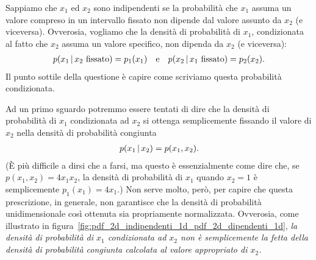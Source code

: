 Sappiamo che $x_1$ ed $x_2$ sono indipendenti se la probabilità che $x_1$
assuma un valore compreso in un intervallo fissato non dipende dal valore assunto
da $x_2$ (e viceversa). Ovverosia, vogliamo che la densità di probabilità di
$x_1$, condizionata al fatto che $x_2$ assuma un valore specifico, non dipenda
da $x_2$ (e viceversa):
\begin{align*}
  p(x_1 \,|\, x_2~\text{fissato}) = p_1(x_1) \quad \text{e} \quad
  p(x_2 \,|\, x_1~\text{fissato}) = p_2(x_2).
\end{align*}
Il punto sottile della questione è capire come scriviamo questa probabilità
condizionata.

Ad un primo sguardo potremmo essere tentati di dire che la densità di probabilità
di $x_1$ condizionata ad $x_2$ si ottenga semplicemente fissando il valore
di $x_2$ nella densità di probabilità congiunta
\begin{align*}
  p(x_1 \,|\, x_2) = p(x_1, x_2).
\end{align*}
(\`E più difficile a dirsi che a farsi, ma questo è essenzialmente come dire
che, se $p(x_1, x_2) = 4x_1x_2$, la densità di probabilità di $x_1$ quando
$x_2 = 1$ è semplicemente $p_1(x_1) = 4x_1$.) Non serve molto, però, per capire
che questa prescrizione, in generale, non garantisce che la densità di
probabilità unidimensionale così ottenuta sia propriamente normalizzata.
Ovverosia, come illustrato in figura~\ref{fig:pdf_2d_indipendenti_1d_pdf_2d_dipendenti_1d},
\emph{la densità di probabilità di $x_1$ condizionata ad $x_2$ non
è semplicemente la fetta della densità di probabilità congiunta
calcolata al valore appropriato di $x_2$.}


